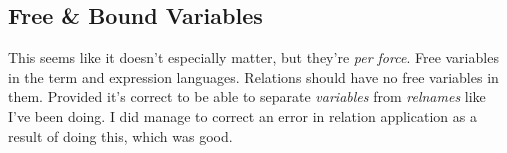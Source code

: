 \documentclass[11pt,twoside]{article}
\numberwithin{equation}{subsection} %
\begin{document}

\subsection{Free \& Bound Variables}

This seems like it doesn't especially matter, but they're \emph{per force}. Free variables in the term and expression languages. Relations should
have no free variables in them. Provided it's correct to be able to
separate \emph{variables} from \emph{relnames} like I've been doing. I
did manage to correct an error in relation application as a result of doing this,
which was good.

\vspace{.5cm}
\end{document}

